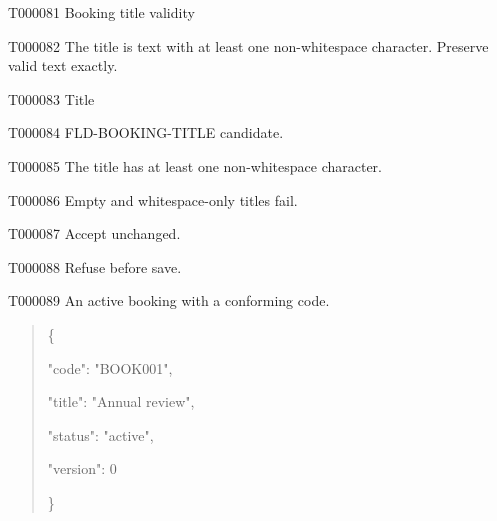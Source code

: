\documentclass[11pt,a4paper]{article}
\begin{document}
\begin{atlastext}{T000081}
Booking title validity
\end{atlastext}
\begin{atlasparagraph}{T000082}
The title is text with at least one non-whitespace character. Preserve valid text exactly.
\end{atlasparagraph}
\begin{atlastext}{T000083}
Title
\end{atlastext}
\begin{atlasparagraph}{T000084}
FLD-BOOKING-TITLE candidate.
\end{atlasparagraph}
\begin{atlastext}{T000085}
The title has at least one non-whitespace character.
\end{atlastext}
\begin{atlasparagraph}{T000086}
Empty and whitespace-only titles fail.
\end{atlasparagraph}
\begin{atlasparagraph}{T000087}
Accept unchanged.
\end{atlasparagraph}
\begin{atlasparagraph}{T000088}
Refuse before save.
\end{atlasparagraph}
\begin{atlasparagraph}{T000089}
An active booking with a conforming code.
\end{atlasparagraph}
\par\noindent\begin{minipage}{\linewidth}
\begin{quote}\small\ttfamily\raggedright
\noindent \{\par
\noindent   "code":\allowbreak{} "BOOK001",\par
\noindent   "title":\allowbreak{} "Annual review",\par
\noindent   "status":\allowbreak{} "active",\par
\noindent   "version":\allowbreak{} 0\par
\noindent \}\par
\end{quote}
\end{minipage}\par
\end{document}
